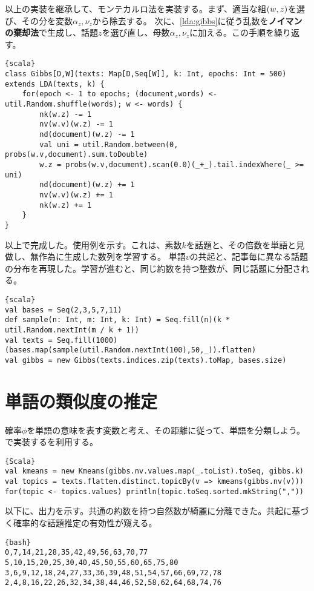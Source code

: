 \documentclass[10pt,a4paper]{book}
\begin{document}
以上の実装を継承して、モンテカルロ法を実装する。まず、適当な組$\pair{w}{z}$を選び、その分を変数$\alpha_z,\nu_z$から除去する。
次に、\eqref{lda:gibbs}に従う乱数を\textbf{ノイマンの棄却法}で生成し、話題$z$を選び直し、母数$\alpha_z,\nu_z$に加える。この手順を繰り返す。

\begin{Verbatim}{scala}
class Gibbs[D,W](texts: Map[D,Seq[W]], k: Int, epochs: Int = 500) extends LDA(texts, k) {
	for(epoch <- 1 to epochs; (document,words) <- util.Random.shuffle(words); w <- words) {
		nk(w.z) -= 1
		nv(w.v)(w.z) -= 1
		nd(document)(w.z) -= 1
		val uni = util.Random.between(0, probs(w.v,document).sum.toDouble)
		w.z = probs(w.v,document).scan(0.0)(_+_).tail.indexWhere(_ >= uni)
		nd(document)(w.z) += 1
		nv(w.v)(w.z) += 1
		nk(w.z) += 1
	}
}
\end{Verbatim}

以上で完成した。使用例を示す。これは、素数$k$を話題と、その倍数を単語と見做し、無作為に生成した数列を学習する。
単語$v$の共起と、記事毎に異なる話題の分布を再現した。学習が進むと、同じ約数を持つ整数が、同じ話題に分配される。

\begin{Verbatim}{scala}
val bases = Seq(2,3,5,7,11)
def sample(n: Int, m: Int, k: Int) = Seq.fill(n)(k * util.Random.nextInt(m / k + 1)) 
val texts = Seq.fill(1000)(bases.map(sample(util.Random.nextInt(100),50,_)).flatten)
val gibbs = new Gibbs(texts.indices.zip(texts).toMap, bases.size)
\end{Verbatim}

\section{単語の類似度の推定}

確率$\phi$を単語の意味を表す変数と考え、その距離に従って、単語を分類しよう。で実装する\kmean{}を利用する。

\begin{Verbatim}{Scala}
val kmeans = new Kmeans(gibbs.nv.values.map(_.toList).toSeq, gibbs.k)
val topics = texts.flatten.distinct.topicBy(v => kmeans(gibbs.nv(v)))
for(topic <- topics.values) println(topic.toSeq.sorted.mkString(","))
\end{Verbatim}

以下に、出力を示す。共通の約数を持つ自然数が綺麗に分離できた。共起に基づく確率的な話題推定の有効性が窺える。

\begin{Verbatim}{bash}
0,7,14,21,28,35,42,49,56,63,70,77
5,10,15,20,25,30,40,45,50,55,60,65,75,80
3,6,9,12,18,24,27,33,36,39,48,51,54,57,66,69,72,78
2,4,8,16,22,26,32,34,38,44,46,52,58,62,64,68,74,76
\end{Verbatim}
\end{document}
